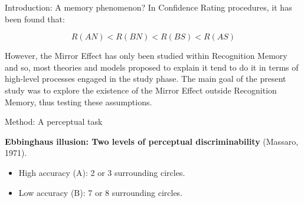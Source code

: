 \documentclass[final]{beamer}
\newlength{\onecolwid}
\begin{document}
\begin{frame}[t]
\begin{columns}[t]
\begin{column}{\onecolwid}
\begin{alertblock}{Introduction: A memory phenomenon?}
In Confidence Rating procedures, it has been found that:

\begin{equation}
R(AN) < R(BN) < R(BS) < R(AS)
\label{eqn:Confidence}
\end{equation}

However, the Mirror Effect has only been studied within Recognition Memory and so, most theories and models proposed to explain it tend to do it in terms of high-level processes engaged in the study phase. The main goal of the present study was to explore the existence of the Mirror Effect outside Recognition Memory, thus testing these assumptions. 
\end{alertblock}



\begin{alertblock}{Method: A perceptual task}

\textbf{Ebbinghaus illusion: Two levels of perceptual discriminability} (Massaro, 1971).

\begin{itemize}
\item High accuracy (A): 2 or 3 surrounding circles.
\item Low accuracy (B): 7 or 8 surrounding circles.
\end{itemize}


\end{alertblock}
\end{column}
\end{columns}
\end{frame}
\end{document}

